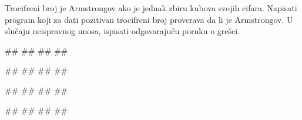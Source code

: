 \begin{Exercise}[label=KT_NG_13] 
Trocifreni broj je Armstrongov ako je jednak zbiru kubova svojih cifara. 
Napisati program koji za dati pozitivan trocifreni broj proverava 
da li je Armstrongov.
U slučaju neispravnog unosa, ispisati odgovarajuću poruku o grešci.

\begin{miditest}
\begin{upotreba}{1}
#\naslovInt#
##
##
##
\end{upotreba}
\end{miditest}
\begin{miditest}
\begin{upotreba}{2}
#\naslovInt#
##
##
##
\end{upotreba}
\end{miditest}

\begin{miditest}
\begin{upotreba}{3}
#\naslovInt#
##
##
##
\end{upotreba}
\end{miditest}
\begin{miditest}
\begin{upotreba}{4}
#\naslovInt#
##
##
##
\end{upotreba}
\end{miditest}

\end{Exercise}
\ifresenja
 \begin{Answer}[ref=KT_NG_13]
\end{Answer}
\fi


